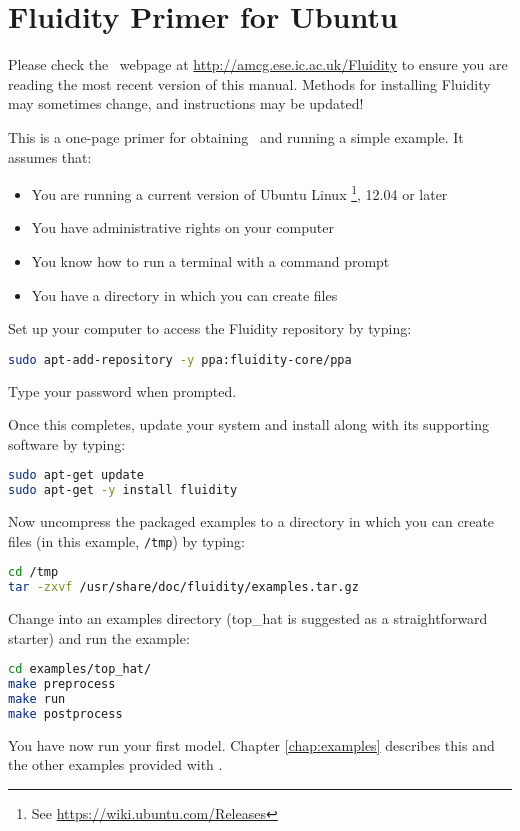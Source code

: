 \chapter*{Fluidity Primer for Ubuntu}

Please check the \fluidity\ webpage at
\href{http://amcg.ese.ic.ac.uk/Fluidity}{http://amcg.ese.ic.ac.uk/Fluidity}
to ensure you are reading the most recent version of this manual. Methods for
installing Fluidity may sometimes change, and instructions may be updated!

This is a one-page primer for obtaining \fluidity\ and running a simple example. It assumes that:

\begin{itemize}
 \item You are running a current version of Ubuntu Linux
         \footnote{
See \href{https://wiki.ubuntu.com/Releases}{https://wiki.ubuntu.com/Releases}
                  }, 12.04 or later
 \item You have administrative rights on your computer
 \item You know how to run a terminal with a command prompt
 \item You have a directory in which you can create files
\end{itemize}

Set up your computer to access the Fluidity repository by typing:

\begin{lstlisting}[language=Bash]
sudo apt-add-repository -y ppa:fluidity-core/ppa
\end{lstlisting}

Type your password when prompted.

Once this completes, update your system and install \fluidity along with its
supporting software by typing:

\begin{lstlisting}[language=Bash]
sudo apt-get update
sudo apt-get -y install fluidity
\end{lstlisting}

Now uncompress the packaged examples to a directory in which you can create
files (in this example, \lstinline[language=Bash]+/tmp+) by typing:

\begin{lstlisting}[language=Bash]
cd /tmp
tar -zxvf /usr/share/doc/fluidity/examples.tar.gz
\end{lstlisting}

Change into an examples directory (top\_hat is suggested as a straightforward
starter) and run the example:

\begin{lstlisting}[language=Bash]
cd examples/top_hat/
make preprocess
make run
make postprocess
\end{lstlisting}

You have now run your first \fluidity model. Chapter \ref{chap:examples}
describes this and the other examples provided with \fluidity.  
